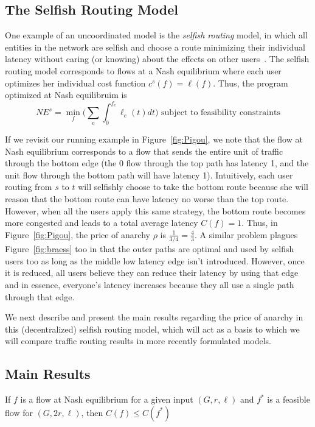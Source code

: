 \subsection{The Selfish Routing Model}
One example of an uncoordinated model is the \emph{selfish routing} model, in which all entities in the network are selfish and choose a route minimizing their individual latency without caring (or knowing) about the effects on other users~\cite{tardos}.
The selfish routing model corresponds to flows at a Nash equilibrium where each user optimizes her individual cost function
$c^s(f) = \ell(f)$.
Thus, the program optimized at Nash equilibruim is
$$NE^{s} = \min_f\Big(\sum_e \int_0^{f_e} \ell_e(t)dt\Big) \text{ subject to feasibility constraints}$$

If we revisit our running example in Figure~\ref{fig:Pigou}, we note that the flow at Nash equilibrium corresponds to a flow that sends the entire unit of traffic through the bottom edge (the 0 flow through the top path has latency 1, and the unit flow through the bottom path will have latency 1).
Intuitively, each user routing from $s$ to $t$ will selfishly choose to take the bottom route because she will reason that the bottom route can have latency no worse than the top route. However, when all the users apply this same strategy, the bottom route becomes more congested and leads to a total average latency $C(f) = 1$.
Thus, in Figure~\ref{fig:Pigou}, the price of anarchy $\rho$ is $\frac{1}{3/4} = \frac{4}{3}$. A similar problem plagues Figure~\ref{fig:braess} too in that the outer paths are optimal and used by selfish users too as long as the 
middle low latency edge isn't introduced. However, once it is reduced, all users believe they can reduce their latency by using that edge and in essence, everyone's latency increases because they all use a single path through that
edge.

We next describe and present the main results regarding the price of anarchy in this (decentralized) selfish routing model, which will act as a basis to which we will compare traffic routing results in more recently formulated models.

\subsection{Main Results}
\begin{theorem}
    If $f$ is a flow at Nash equilibrium for a given input $(G, r, \ell)$ and $f^*$ is a feasible flow for $(G, 2r, \ell)$, then $C(f) \leq C(f^*)$
\end{theorem}

